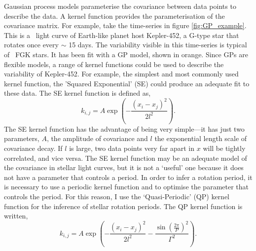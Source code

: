 Gaussian process models parameterise the covariance between data points to
describe the data.
A kernel function provides the parameterisation of the covariance matrix.
For example, take the time-series in figure \ref{fig:GP_example}.
This is a \kepler\ light curve of Earth-like planet host Kepler-452, a G-type
star that rotates once every $\sim$ 15 days.
The variability visible in this time-series is typical of \kepler\ FGK stars.
It has been fit with a GP model, shown in orange.
Since GPs are flexible models, a range of kernel functions could be used to
describe the variability of Kepler-452.
For example, the simplest and most commonly used kernel function, the
'Squared Exponential' (SE) could produce an adequate fit to these data.
The SE kernel function is defined as,
\begin{equation}
k_{i,j} = A \exp \left(-\frac{(x_i - x_j)^2}{2l^2} \right).
\end{equation}
\label{eq:SE}
The SE kernel function has the advantage of being very simple---it has just
two parameters, $A$, the amplitude of covariance and $l$ the exponential
length scale of covariance decay.
If $l$ is large, two data points very far apart in $x$ will be tightly
correlated, and vice versa.
The SE kernel function may be an adequate model of the covariance in stellar
light curves, but it is not a `useful' one because it does not have a
parameter that controls a period.
In order to infer a rotation period, it is necessary to use a periodic kernel
function and to optimise the parameter that controls the period.
For this reason, I use the `Quasi-Periodic' (QP) kernel function for the
inference of stellar rotation periods.
The QP kernel function is written,
\begin{equation}
k_{i,j} = A \exp \left(-\frac{(x_i - x_j)^2}{2l^2} -
\frac{\sin(\frac{2\pi}{P})^2}{\Gamma^2} \right).
\end{equation}
\label{eq:QP}

